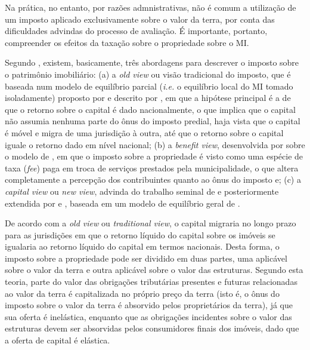 \documentclass[
	12pt,				%
	oneside,			%
	a4paper,			%
	chapter=TITLE,		%
	section=TITLE,		%
	english,			%
	brazil				%
	]{abntex2}
\begin{document}
\begin{refsection}
Na prática, no entanto, por razões admnistrativas, não é comum a utilização
de um imposto aplicado exclusivamente sobre o valor da terra, por conta das
dificuldades advindas do processo de avaliação. É importante, portanto,
compreender os efeitos da taxação sobre o propriedade sobre o \gls{MI}.

Segundo \textcite{oates2016}, existem, basicamente, três abordagens para descrever o
imposto sobre o patrimônio imobiliário: (a) a \emph{old view} ou visão tradicional do
imposto, que é baseada num modelo de equilíbrio parcial (\emph{i.e.} o equilíbrio
local do \gls{MI} tomado isoladamente) proposto por \textcite{simon} e descrito por
\textcite{netzer}, em que a hipótese principal é a de que o retorno sobre o capital é dado
nacionalmente, o que implica que o capital não assumia nenhuma parte do ônus do
imposto predial, haja vista que o capital é móvel e migra de uma jurisdição à
outra, até que o retorno sobre o capital iguale o retorno dado em nível
nacional; (b) a \emph{benefit view}, desenvolvida por \textcite{hamilton1975,hamilton1976a,hamilton1976b} sobre o modelo de \textcite{tiebout}, em que o imposto sobre a propriedade
é visto como uma espécie de taxa (\emph{fee}) paga em troca de serviços prestados
pela municipalidade, o que altera completamente a percepção dos contribuintes
quanto ao ônus do imposto e; (c) a \emph{capital view} ou \emph{new view}, advinda do
trabalho seminal de \textcite{mieszkowski} e posteriormente extendida por \textcite{zodrow1986a} e
\textcite{zodrow1986b}, baseada em um modelo de equilíbrio geral de \textcite{harberger}.

De acordo com a \emph{old view} ou \emph{traditional view}, o capital migraria no longo prazo
para as jurisdições em que o retorno líquido do capital sobre os imóveis se
igualaria ao retorno líquido do capital em termos nacionais. Desta forma, o
imposto sobre a propriedade pode ser dividido em duas partes, uma aplicável
sobre o valor da terra e outra aplicável sobre o valor das estruturas. Segundo
esta teoria, parte do valor das obrigações tributárias presentes e futuras
relacionadas ao valor da terra é capitalizada no próprio preço da terra (isto é,
o ônus do imposto sobre o valor da terra é absorvido pelos proprietários da
terra), já que sua oferta é inelástica, enquanto que as obrigações incidentes
sobre o valor das estruturas devem ser absorvidas pelos consumidores finais dos
imóveis, dado que a oferta de capital é elástica.


\end{refsection}
\end{document}
